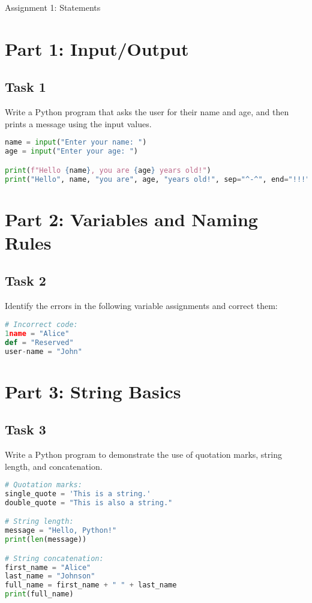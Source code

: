 \documentclass[11pt]{article}
\begin{document}
\begin{center}
    \Large{Assignment 1: Statements}
\end{center}

\section*{Part 1: Input/Output}

\subsection*{Task 1}
Write a Python program that asks the user for their name and age, and then prints a message using the input values.

\begin{lstlisting}[language=Python]
name = input("Enter your name: ")
age = input("Enter your age: ")

print(f"Hello {name}, you are {age} years old!")
print("Hello", name, "you are", age, "years old!", sep="^-^", end="!!!")
\end{lstlisting}

\section*{Part 2: Variables and Naming Rules}

\subsection*{Task 2}
Identify the errors in the following variable assignments and correct them:

\begin{lstlisting}[language=Python]
# Incorrect code:
1name = "Alice" 
def = "Reserved" 
user-name = "John"
\end{lstlisting}

\begin{tcolorbox}[colback=black!10!white, colframe=black!75!white, title=\textbf{Answer}]
    \vspace{2cm}
\end{tcolorbox}

\newpage
    

\section*{Part 3: String Basics}

\subsection*{Task 3}
Write a Python program to demonstrate the use of quotation marks, string length, and concatenation.
\begin{lstlisting}[language=Python]
# Quotation marks:
single_quote = 'This is a string.'
double_quote = "This is also a string."

# String length:
message = "Hello, Python!"
print(len(message))

# String concatenation:
first_name = "Alice"
last_name = "Johnson"
full_name = first_name + " " + last_name
print(full_name)
\end{lstlisting}
\end{document}
